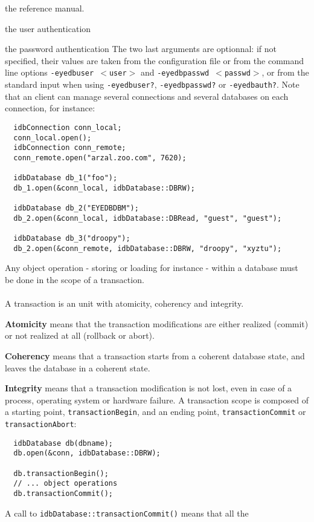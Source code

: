 the reference manual.
\item the user authentication
\item the password authentication
\ee
The two last arguments are optionnal: if not specified, their values
are taken from the configuration file or from the command line options
\texttt{-eyedbuser $<$user$>$} and \texttt{-eyedbpasswd $<$passwd$>$}, or from
the standard input when using \texttt{-eyedbuser?}, \texttt{-eyedbpasswd?} or
\texttt{-eyedbauth?}.
\ee
Note that an \eyedb client can manage several connections and
several databases on each connection, for instance:
\verbsize
\begin{verbatim}
  idbConnection conn_local;
  conn_local.open();
  idbConnection conn_remote;
  conn_remote.open("arzal.zoo.com", 7620);

  idbDatabase db_1("foo");
  db_1.open(&conn_local, idbDatabase::DBRW);

  idbDatabase db_2("EYEDBDBM");
  db_2.open(&conn_local, idbDatabase::DBRead, "guest", "guest");

  idbDatabase db_3("droopy");
  db_2.open(&conn_remote, idbDatabase::DBRW, "droopy", "xyztu");
\end{verbatim}
\normalsize
{}
Any object operation - storing or loading for instance -
within a database must be done in the scope of a transaction.
\\
\\
A transaction is an unit with atomicity, coherency and integrity.
\be
\item {\bf Atomicity} means that the transaction modifications are either
realized (commit) or not realized at all (rollback or abort).
\item {\bf Coherency} means that a transaction starts from a coherent database
state, and leaves the database in a coherent state.
\item {\bf Integrity} means that a transaction modification is not lost, even
in case of a process, operating system or hardware failure.
\ee
A transaction scope is composed of a starting point, \texttt{transactionBegin},
and an ending point, \texttt{transactionCommit} or \texttt{transactionAbort}:
\verbsize
\begin{verbatim}
  idbDatabase db(dbname);
  db.open(&conn, idbDatabase::DBRW);

  db.transactionBegin();
  // ... object operations
  db.transactionCommit();
\end{verbatim}
\normalsize
A call to \texttt{idbDatabase::transactionCommit()} means that all the
